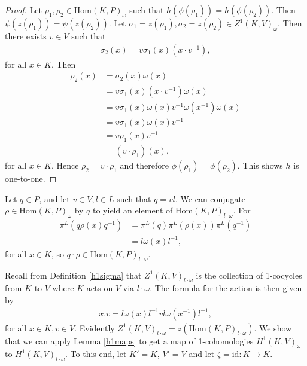 \begin{proof}
Let $\rho_1, \rho_2\in \mathrm{Hom}(K, P)_\omega$ such that $h(\phi(\rho_1)) = h(\phi(\rho_2))$. Then $\psi(z(\rho_1)) = \psi(z(\rho_2))$.
Let $\sigma_1 = z(\rho_1), \sigma_2 = z(\rho_2) \in Z^1(K, V)_\omega$. Then there exists $v \in V$ such that
\begin{align*} \sigma_2(x) = v \sigma_1(x) \left(x \cdot v^{-1}\right), \end{align*}
for all $x \in K$. Then
\begin{align*}
\rho_2(x) 
&= \sigma_2(x)\omega(x) \\
&= v \sigma_1(x) \left(x \cdot v^{-1}\right) \omega(x) \\
&= v \sigma_1(x) \omega(x) v^{-1} \omega(x^{-1}) \omega(x) \\
&= v \sigma_1(x) \omega(x) v^{-1} \\
&= v \rho_1(x) v^{-1} \\
&= (v \cdot \rho_1)(x),
\end{align*}
for all $x \in K$. Hence $\rho_2 = v\cdot \rho_1$ and therefore $\phi\left(\rho_1\right) = \phi\left(\rho_2\right)$. This shows $h$ is one-to-one.
\end{proof}

Let $q \in P$, and let $v \in V, l \in L$ such that $q = vl$. We can conjugate $\rho \in \mathrm{Hom}(K, P)_\omega$ by $q$ to yield an element of $\mathrm{Hom}(K, P)_{l \cdot \omega}$. For
\begin{align*}%
\pi^L\left(q \rho(x) q^{-1}\right)%
&= \pi^L\left(q\right) \pi^L\left(\rho(x)\right) \pi^L\left(q^{-1}\right) \\
&= l \omega(x) l^{-1},
\end{align*}
for all $x \in K$, so $q \cdot \rho \in \mathrm{Hom}(K, P)_{l\cdot \omega}$.

Recall from Definition \ref{h1sigma} that $Z^1(K, V)_{l \cdot \omega}$ is the collection of 1-cocycles from $K$ to $V$ where $K$ acts on $V$ via $l \cdot \omega$. The formula for the action is then given by
\begin{align*}
	x.v = l \omega(x) l^{-1} v l \omega(x^{-1}) l^{-1},
\end{align*}
for all $x \in K, v \in V$. Evidently $Z^1(K, V)_{l \cdot \omega} = z\left(\mathrm{Hom}(K, P)_{l \cdot \omega}\right)$. 
We show that we can apply Lemma \ref{h1maps} to get a map of 1-cohomologies $H^1(K, V)_\omega$ to $H^1(K, V)_{l \cdot \omega}$. To this end, let $K' = K$, $V' = V$ and let $\zeta = \mathrm{id}:K \rightarrow K$.

